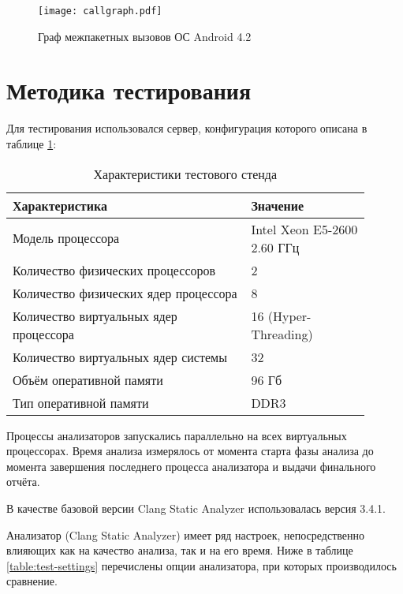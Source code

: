 \begin{figure}
   \centering
   \texttt{[image: callgraph.pdf]}
   \caption{Граф межпакетных вызовов ОС Android 4.2}\label{pic:callgraph}
\end{figure}

\section{Методика тестирования}

Для тестирования использовался сервер, конфигурация которого описана в таблице \ref{table:test-server}:

\begin{table} [htbp]
  \centering
  \parbox{15cm}{\caption{Характеристики тестового стенда}\label{table:test-server}}
  \begin{tabular}{| p{0.6\linewidth} || p{0.3\linewidth} |}
  \hline
  \hline
  Характеристика   & Значение \\
  \hline
  \hline
  Модель процессора   & Intel Xeon E5-2600 2.60 ГГц \\
  \hline
  Количество физических процессоров & 2   \\
  \hline
  Количество физических ядер процессора      & 8    \\
  \hline
  Количество виртуальных ядер процессора  & 16 (Hyper-Threading)   \\
  \hline
  Количество виртуальных ядер системы & 32   \\
  \hline
  Объём оперативной памяти & 96 Гб \\
  \hline
  Тип оперативной памяти & DDR3 \\
  \hline
  \hline
  \end{tabular}
\end{table}

Процессы анализаторов запускались параллельно на всех виртуальных процессорах. Время анализа измерялось от момента старта фазы анализа до момента завершения последнего процесса анализатора и выдачи финального отчёта.

В качестве базовой версии Clang Static Analyzer использовалась версия 3.4.1.

Анализатор (Clang Static Analyzer) имеет ряд настроек, непосредственно влияющих как на качество анализа, так и на его время. Ниже в таблице \ref{table:test-settings} перечислены опции анализатора, при которых производилось сравнение.

